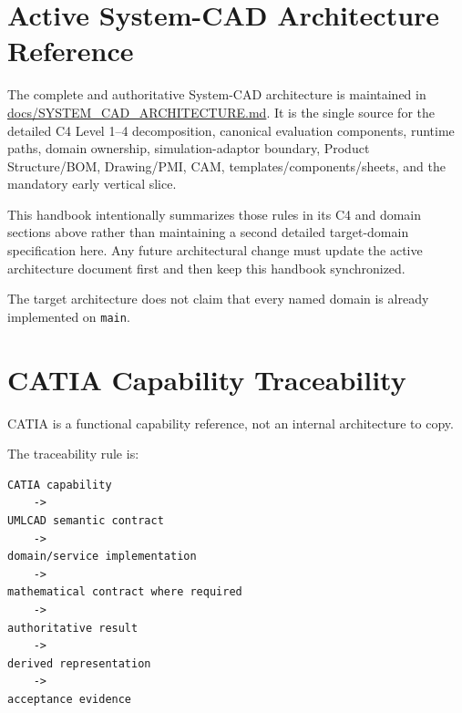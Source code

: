 \documentclass[11pt,a4paper]{report}
\newcommand{\pathref}[1]{\url{#1}}
\begin{document}
\chapter{Active System-CAD Architecture Reference}

The complete and authoritative System-CAD architecture is maintained in \pathref{docs/SYSTEM_CAD_ARCHITECTURE.md}. It is the single source for the detailed C4 Level 1--4 decomposition, canonical evaluation components, runtime paths, domain ownership, simulation-adaptor boundary, Product Structure/BOM, Drawing/PMI, CAM, templates/components/sheets, and the mandatory early vertical slice.

This handbook intentionally summarizes those rules in its C4 and domain sections above rather than maintaining a second detailed target-domain specification here. Any future architectural change must update the active architecture document first and then keep this handbook synchronized.

The target architecture does not claim that every named domain is already implemented on \texttt{main}.

\chapter{CATIA Capability Traceability}

CATIA is a functional capability reference, not an internal architecture to copy.

The traceability rule is:

\begin{lstlisting}
CATIA capability
    ->
UMLCAD semantic contract
    ->
domain/service implementation
    ->
mathematical contract where required
    ->
authoritative result
    ->
derived representation
    ->
acceptance evidence
\end{lstlisting}
\end{document}
